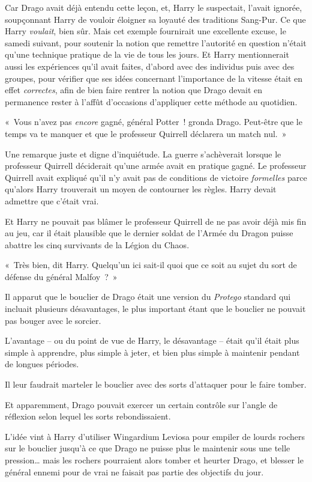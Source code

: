 {Car Drago avait déjà entendu cette leçon, et, Harry le suspectait, l'avait ignorée, soupçonnant Harry de vouloir éloigner sa loyauté des traditions Sang-Pur.
Ce que Harry \emph{voulait}, bien sûr.
Mais cet exemple fournirait une excellente excuse, le samedi suivant, pour soutenir la notion que remettre l'autorité en question n'était qu'une technique pratique de la vie de tous les jours.
Et Harry mentionnerait aussi les expériences qu'il avait faites, d'abord avec des individus puis avec des groupes, pour vérifier que ses idées concernant l'importance de la vitesse était en effet \emph{correctes}, afin de bien faire rentrer la notion que Drago devait en permanence rester à l'affût d'occasions d'appliquer cette méthode au quotidien.

«~Vous n'avez pas \emph{encore} gagné, général Potter~! gronda Drago.
Peut-être que le temps va te manquer et que le professeur Quirrell déclarera un match nul.~»

Une remarque juste et digne d'inquiétude.
La guerre s'achèverait lorsque le professeur Quirrell déciderait qu'une armée avait en pratique gagné.
Le professeur Quirrell avait expliqué qu'il n'y avait pas de conditions de victoire \emph{formelles} parce qu'alors Harry trouverait un moyen de contourner les règles.
Harry devait admettre que c'était vrai.

Et Harry ne pouvait pas blâmer le professeur Quirrell de ne pas avoir déjà mis fin au jeu, car il était plausible que le dernier soldat de l'Armée du Dragon puisse abattre les cinq survivants de la Légion du Chaos.

«~Très bien, dit Harry.
Quelqu'un ici sait-il quoi que ce soit au sujet du sort de défense du général Malfoy~?~»

Il apparut que le bouclier de Drago était une version du \emph{Protego} standard qui incluait plusieurs désavantages, le plus important étant que le bouclier ne pouvait pas bouger avec le sorcier.

L'avantage -- ou du point de vue de Harry, le désavantage -- était qu'il était plus simple à apprendre, plus simple à jeter, et bien plus simple à maintenir pendant de longues périodes.

Il leur faudrait marteler le bouclier avec des sorts d'attaquer pour le faire tomber.

Et apparemment, Drago pouvait exercer un certain contrôle sur l'angle de réflexion selon lequel les sorts rebondissaient.

L'idée vint à Harry d'utiliser Wingardium Leviosa pour empiler de lourds rochers sur le bouclier jusqu'à ce que Drago ne puisse plus le maintenir sous une telle pression… mais les rochers pourraient alors tomber et heurter Drago, et blesser le général ennemi pour de vrai ne faisait pas partie des objectifs du jour.

}
